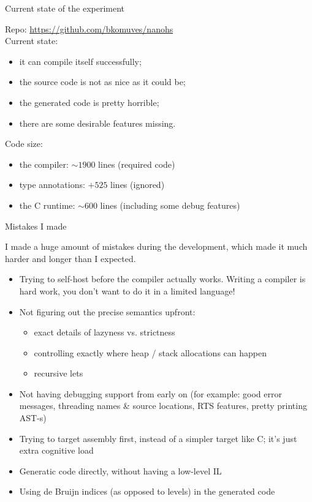 \documentclass{beamer}
\begin{document}

\begin{frame}{Current state of the experiment}

Repo: \url{https://github.com/bkomuves/nanohs}\\[15pt]

Current state:
\begin{itemize}
\item it can compile itself successfully;
\item the source code is not as nice as it could be;
\item the generated code is pretty horrible;
\item there are some desirable features missing.\\[15pt]
\end{itemize}

Code size:
\begin{itemize}
\item the compiler: $\sim 1900$ lines (required code)
\item type annotations: $+525$ lines (ignored)
\item the C runtime: $\sim 600$ lines (including some debug features)
\end{itemize}

\end{frame}


\begin{frame}{Mistakes I made}

{\small
I made a huge amount of mistakes during the development, which made it much
harder and longer than I expected.

\begin{itemize}
\item Trying to self-host before the compiler actually works. Writing a 
compiler is hard work, you don't want to do it in a limited language!
\item Not figuring out the precise semantics upfront:
   \begin{itemize}
   \item exact details of lazyness vs. strictness
   \item controlling exactly where heap / stack allocations can happen
   \item recursive lets
   \end{itemize}
\item Not having debugging support from early on (for example: good error messages, 
      threading names \& source locations, RTS features, pretty printing AST-s)
\item Trying to target assembly first, instead of a simpler target like C; it's just extra cognitive load
\item Generatic code directly, without having a low-level IL
\item Using de Bruijn indices (as opposed to levels) in the generated code
\end{itemize}
}

\end{frame}
\end{document}
